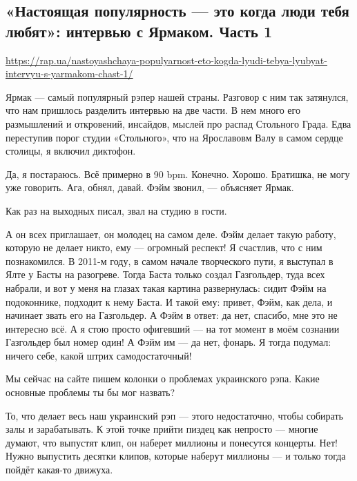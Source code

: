  
 

\subsection{«Настоящая популярность --- это когда люди тебя любят»: интервью с Ярмаком. Часть 1}
\label{sec:02_02_2017.news.ua.rap_ua.1.yarmak}

\url{https://rap.ua/nastoyashchaya-populyarnost-eto-kogda-lyudi-tebya-lyubyat-intervyu-s-yarmakom-chast-1/}

Ярмак --- самый популярный рэпер нашей страны. Разговор с ним так затянулся, что
нам пришлось разделить интервью на две части. В нем много его размышлений и
откровений, инсайдов, мыслей про распад Стольного  Града. Едва переступив порог
студии «Стольного», что на Ярославовм Валу в самом сердце столицы, я включил
диктофон.  

Да, я постараюсь. Всё примерно в 90 bpm. Конечно. Хорошо. Братишка, не могу уже
говорить. Ага, обнял, давай. Фэйм звонил, --- объясняет Ярмак.

Как раз на выходных писал, звал на студию в гости.

А он всех приглашает, он молодец на самом деле. Фэйм делает такую работу,
которую не делает никто, ему --- огромный респект! Я счастлив, что с ним
познакомился. В 2011-м году, в самом начале творческого пути, я выступал в Ялте
у Басты на разогреве. Тогда Баста только создал Газгольдер, туда всех набрали,
и вот у меня на глазах такая картина развернулась: сидит Фэйм на подоконнике,
подходит к нему Баста. И такой ему: привет, Фэйм, как дела, и начинает звать
его на Газгольдер. А Фэйм в ответ: да нет, спасибо, мне это не интересно всё. А
я стою просто офигевший --- на тот момент в моём сознании Газгольдер был номер
один! А Фэйм им --- да нет, фонарь. Я тогда подумал: ничего себе, какой штрих
самодостаточный!

Мы сейчас на сайте пишем колонки о проблемах украинского рэпа. Какие основные
проблемы ты бы мог назвать?

То, что делает весь наш украинский рэп --- этого недостаточно, чтобы собирать
залы и зарабатывать. К этой точке прийти пиздец как непросто --- многие думают,
что выпустят клип, он наберет миллионы и понесутся концерты. Нет! Нужно
выпустить десятки клипов, которые наберут миллионы --- и только тогда пойдёт
какая-то движуха.

